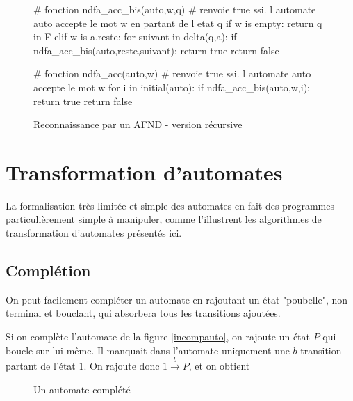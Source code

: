 \begin{figure}[!ht]
\begin{python}
# fonction ndfa_acc_bis(auto,w,q)
# renvoie true ssi. l automate auto accepte le mot w en partant de l etat q
if w is empty:
    return q in F
elif w is a.reste:
    for suivant in delta(q,a):
        if ndfa_acc_bis(auto,reste,suivant):
            return true
    return false


# fonction ndfa_acc(auto,w)
# renvoie true ssi. l automate auto accepte le mot w
for i in initial(auto):
    if ndfa_acc_bis(auto,w,i):
        return true
return false
\end{python}
\caption{Reconnaissance par un AFND - version récursive}
\end{figure}
\newpage

\section{Transformation d'automates}
\label{transauto}


La formalisation très limitée et simple des automates en fait des programmes particulièrement simple à manipuler, comme l'illustrent les algorithmes de transformation d'automates présentés ici.

\subsection{Complétion}


On peut facilement compléter un automate en rajoutant un état "poubelle", non terminal et bouclant, qui absorbera tous les transitions ajoutées.

\begin{example}
Si on complète l'automate de la figure \ref{incompauto}, on rajoute un état $P$ qui boucle sur lui-même. Il manquait dans l'automate uniquement une $b$-transition partant de l'état $1$. On rajoute donc $1 \xrightarrow{b} P$, et on obtient 

\begin{figure}[!h]
\centering
{}
\caption{Un automate complété}
\label{incompautocor}
\end{figure}
\end{example}

